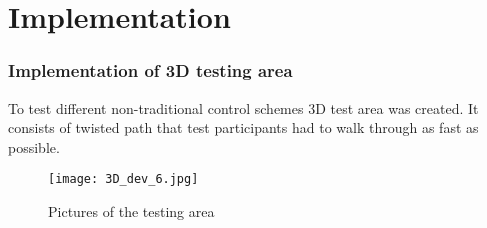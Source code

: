\chapter{Implementation}

\subsection{Implementation of 3D testing area}
To test different non-traditional control schemes 3D test area was created. It consists of twisted path that test participants had to walk through as fast as possible.
\begin{figure}[H]
\centering
\texttt{[image: 3D\_dev\_6.jpg]}
\caption{Pictures of the testing area}
\end{figure}

